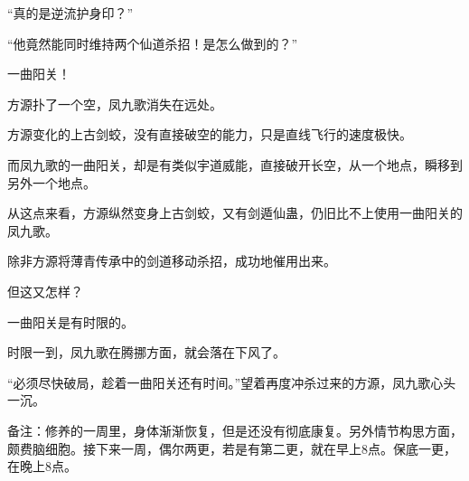 \begin{this_body}
“真的是逆流护身印？”

“他竟然能同时维持两个仙道杀招！是怎么做到的？”

一曲阳关！

方源扑了一个空，凤九歌消失在远处。

方源变化的上古剑蛟，没有直接破空的能力，只是直线飞行的速度极快。

而凤九歌的一曲阳关，却是有类似宇道威能，直接破开长空，从一个地点，瞬移到另外一个地点。

从这点来看，方源纵然变身上古剑蛟，又有剑遁仙蛊，仍旧比不上使用一曲阳关的凤九歌。

除非方源将薄青传承中的剑道移动杀招，成功地催用出来。

但这又怎样？

一曲阳关是有时限的。

时限一到，凤九歌在腾挪方面，就会落在下风了。

“必须尽快破局，趁着一曲阳关还有时间。”望着再度冲杀过来的方源，凤九歌心头一沉。

备注：修养的一周里，身体渐渐恢复，但是还没有彻底康复。另外情节构思方面，颇费脑细胞。接下来一周，偶尔两更，若是有第二更，就在早上8点。保底一更，在晚上8点。

\end{this_body}

